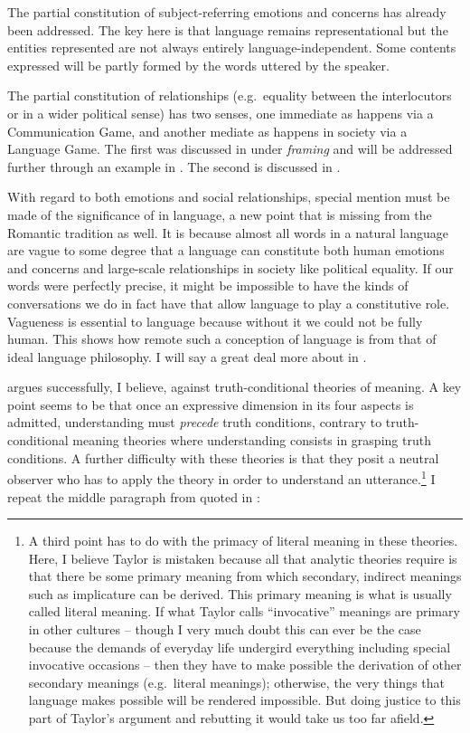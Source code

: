 The partial constitution of subject-referring emotions and concerns has already been addressed. The key here is that language remains representational but the entities represented are not always entirely language-independent. Some contents expressed will be partly formed by the words uttered by the speaker.

The partial constitution of relationships (e.g.\ equality between the interlocutors or  in a wider political sense) has two senses, one immediate as happens via a Communication Game, and another mediate as happens in society via a Language Game. The first was discussed in  under \emph{framing} and will be addressed further through an example in . The second is discussed in . 

With regard to both emotions and social relationships, special mention must be made of the significance of  in language, a new point that is missing from the Romantic tradition as well. It is because almost all words in a natural language are vague to some degree that a language can constitute both human emotions and concerns and large-scale relationships in society like political equality. If our words were perfectly precise, it might be impossible to have the kinds of conversations we do in fact have that allow language to play a constitutive role. Vagueness is essential to language because without it we could not be fully human. This shows how remote such a conception of language is from that of ideal language philosophy. I will say a great deal more about  in .

\citet[273--292]{taylor:tm} argues successfully, I believe, against truth-con\-di\-tio\-nal theories of meaning. A key point seems to be that once an expressive dimension in its four aspects is admitted, understanding must \emph{precede} truth conditions, contrary to truth-con\-di\-tio\-nal meaning theories where understanding consists in grasping truth conditions. A further difficulty with these theories is that they posit a neutral observer who has to apply the theory in order to understand an utterance.\footnote{A third point has to do with the primacy of literal meaning in these theories. Here, I believe Taylor is mistaken because all that analytic theories require is that there be some primary meaning from which secondary, indirect meanings such as implicature can be derived. This primary meaning is what is usually called literal meaning. If what Taylor calls ``invocative'' meanings are primary in other cultures -- though I very much doubt this can ever be the case because the demands of everyday life undergird everything including special invocative occasions -- then they have to make possible the derivation of other secondary meanings (e.g.\ literal meanings); otherwise, the very things that language makes possible will be rendered impossible. But doing justice to this part of Taylor's argument and rebutting it would take us too far afield.} I repeat the middle paragraph from \citet{dummett:oap} quoted in :

